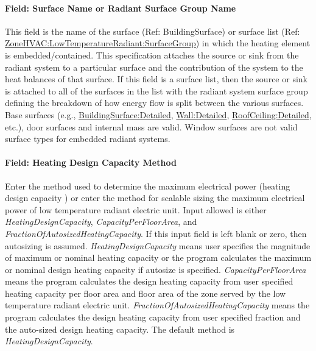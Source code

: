 \paragraph{Field: Surface Name or Radiant Surface Group Name}\label{field-surface-name-or-radiant-surface-group-name-2}

This field is the name of the surface (Ref: BuildingSurface) or surface list (Ref: \hyperref[zonehvaclowtemperatureradiantsurfacegroup]{ZoneHVAC:LowTemperatureRadiant:SurfaceGroup}) in which the heating element is embedded/contained. This specification attaches the source or sink from the radiant system to a particular surface and the contribution of the system to the heat balances of that surface. If this field is a surface list, then the source or sink is attached to all of the surfaces in the list with the radiant system surface group defining the breakdown of how energy flow is split between the various surfaces. Base surfaces (e.g., \hyperref[buildingsurfacedetailed]{BuildingSurface:Detailed}, \hyperref[walldetailed]{Wall:Detailed}, \hyperref[roofceilingdetailed]{RoofCeiling:Detailed}, etc.), door surfaces and internal mass are valid. Window surfaces are not valid surface types for embedded radiant systems.

\paragraph{Field: Heating Design Capacity Method}\label{field-heating-design-capacity-method-6}

Enter the method used to determine the maximum electrical power (heating design capacity ) or enter the method for scalable sizing the maximum electrical power of low temperature radiant electric unit. Input allowed is either \emph{HeatingDesignCapacity}, \emph{CapacityPerFloorArea}, and \emph{FractionOfAutosizedHeatingCapacity}. If this input field is left blank or zero, then autosizing is assumed. \emph{HeatingDesignCapacity} means user specifies the magnitude of maximum or nominal heating capacity or the program calculates the maximum or nominal design heating capacity if autosize is specified. \emph{CapacityPerFloorArea} means the program calculates the design heating capacity from user specified heating capacity per floor area and floor area of the zone served by the low temperature radiant electric unit. \emph{FractionOfAutosizedHeatingCapacity} means the program calculates the design heating capacity from user specified fraction and the auto-sized design heating capacity. The default method is \emph{HeatingDesignCapacity}.

